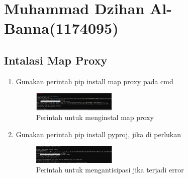 \section{Muhammad Dzihan Al-Banna(1174095)}
\subsection{Intalasi Map Proxy}
\begin{enumerate}
    \item Gunakan perintah pip install map proxy pada cmd
    \hfill\break
    \begin{figure}[H]
		\includegraphics[width=4cm]{figures/1174095/5/Capture.png}
		\centering
		\caption{Perintah untuk menginstal map proxy}
    \end{figure}
    \item Gunakan perintah pip install pyproj, jika di perlukan
    \hfill\break
    \begin{figure}[H]
		\includegraphics[width=4cm]{figures/1174095/5/Capture2.png}
		\centering
		\caption{Perintah untuk mengantisipasi jika terjadi error}
    \end{figure}
\end{enumerate}

